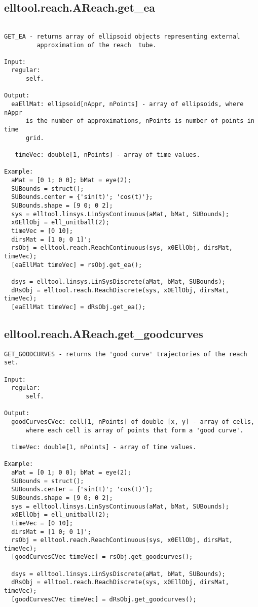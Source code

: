 \subsection{\texorpdfstring{elltool.reach.AReach.get\_ea}{get\_ea}}\label{method:elltool.reach.AReach.getea}
\begin{verbatim}

GET_EA - returns array of ellipsoid objects representing external
         approximation of the reach  tube.

Input:
  regular:
      self.

Output:
  eaEllMat: ellipsoid[nAppr, nPoints] - array of ellipsoids, where nAppr
      is the number of approximations, nPoints is number of points in time
      grid.

   timeVec: double[1, nPoints] - array of time values.

Example:
  aMat = [0 1; 0 0]; bMat = eye(2);
  SUBounds = struct();
  SUBounds.center = {'sin(t)'; 'cos(t)'};
  SUBounds.shape = [9 0; 0 2];
  sys = elltool.linsys.LinSysContinuous(aMat, bMat, SUBounds);
  x0EllObj = ell_unitball(2);
  timeVec = [0 10];
  dirsMat = [1 0; 0 1]';
  rsObj = elltool.reach.ReachContinuous(sys, x0EllObj, dirsMat, timeVec);
  [eaEllMat timeVec] = rsObj.get_ea();

  dsys = elltool.linsys.LinSysDiscrete(aMat, bMat, SUBounds);
  dRsObj = elltool.reach.ReachDiscrete(sys, x0EllObj, dirsMat, timeVec);
  [eaEllMat timeVec] = dRsObj.get_ea();
\end{verbatim}
\subsection{\texorpdfstring{elltool.reach.AReach.get\_goodcurves}{get\_goodcurves}}\label{method:elltool.reach.AReach.getgoodcurves}
\begin{verbatim}
GET_GOODCURVES - returns the 'good curve' trajectories of the reach set.

Input:
  regular:
      self.

Output:
  goodCurvesCVec: cell[1, nPoints] of double [x, y] - array of cells,
      where each cell is array of points that form a 'good curve'.

  timeVec: double[1, nPoints] - array of time values.

Example:
  aMat = [0 1; 0 0]; bMat = eye(2);
  SUBounds = struct();
  SUBounds.center = {'sin(t)'; 'cos(t)'};
  SUBounds.shape = [9 0; 0 2];
  sys = elltool.linsys.LinSysContinuous(aMat, bMat, SUBounds);
  x0EllObj = ell_unitball(2);
  timeVec = [0 10];
  dirsMat = [1 0; 0 1]';
  rsObj = elltool.reach.ReachContinuous(sys, x0EllObj, dirsMat, timeVec);
  [goodCurvesCVec timeVec] = rsObj.get_goodcurves();

  dsys = elltool.linsys.LinSysDiscrete(aMat, bMat, SUBounds);
  dRsObj = elltool.reach.ReachDiscrete(sys, x0EllObj, dirsMat, timeVec);
  [goodCurvesCVec timeVec] = dRsObj.get_goodcurves();
\end{verbatim}
